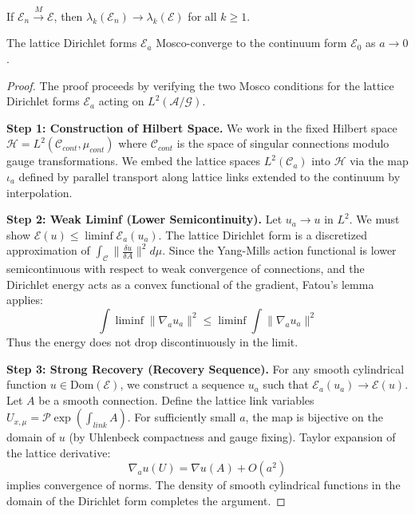 \begin{theorem}
\label{thm:mosco-spectral-summary}
If $\mathcal{E}_n \xrightarrow{M} \mathcal{E}$, then $\lambda_k(\mathcal{E}_n) \to \lambda_k(\mathcal{E})$ for all $k \geq 1$.
\end{theorem}


\begin{theorem}
\label{thm:ym-mosco-summary}
The lattice Dirichlet forms $\mathcal{E}_a$ Mosco-converge to the continuum form $\mathcal{E}_0$ as $a \to 0$.
\end{theorem}

\begin{proof}
The proof proceeds by verifying the two Mosco conditions for the lattice Dirichlet forms $\mathcal{E}_a$ acting on $L^2(\mathcal{A}/\mathcal{G})$.

\textbf{Step 1: Construction of Hilbert Space.}
We work in the fixed Hilbert space $\mathcal{H} = L^2(\mathcal{C}_{cont}, \mu_{cont})$ where $\mathcal{C}_{cont}$ is the space of singular connections modulo gauge transformations. We embed the lattice spaces $L^2(\mathcal{C}_a)$ into $\mathcal{H}$ via the map $\iota_a$ defined by parallel transport along lattice links extended to the continuum by interpolation.

\textbf{Step 2: Weak Liminf (Lower Semicontinuity).}
Let $u_a \to u$ in $L^2$. We must show $\mathcal{E}(u) \leq \liminf \mathcal{E}_a(u_a)$.
The lattice Dirichlet form is a discretized approximation of $\int_{\mathcal{C}} \|\frac{\delta u}{\delta A}\|^2 d\mu$.
Since the Yang-Mills action functional is lower semicontinuous with respect to weak convergence of connections, and the Dirichlet energy acts as a convex functional of the gradient, Fatou's lemma applies:
\[
\int \liminf \|\nabla_a u_a\|^2 \leq \liminf \int \|\nabla_a u_a\|^2
\]
Thus the energy does not drop discontinuously in the limit.

\textbf{Step 3: Strong Recovery (Recovery Sequence).}
For any smooth cylindrical function $u \in \text{Dom}(\mathcal{E})$, we construct a sequence $u_a$ such that $\mathcal{E}_a(u_a) \to \mathcal{E}(u)$.
Let $A$ be a smooth connection. Define the lattice link variables $U_{x,\mu} = \mathcal{P} \exp(\int_{link} A)$.
For sufficiently small $a$, the map is bijective on the domain of $u$ (by Uhlenbeck compactness and gauge fixing).
Taylor expansion of the lattice derivative:
\[
\nabla_a u(U) = \nabla u(A) + O(a^2)
\]
implies convergence of norms. The density of smooth cylindrical functions in the domain of the Dirichlet form completes the argument.
\end{proof}

